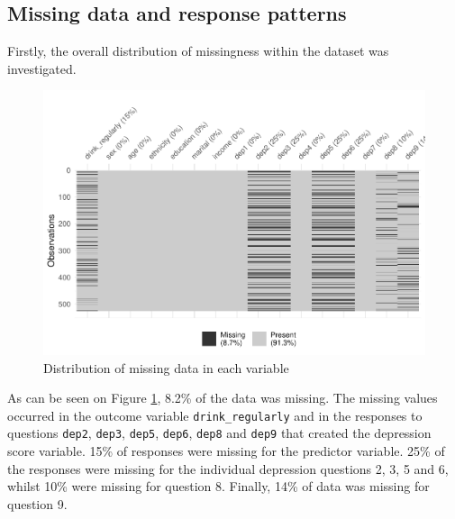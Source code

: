 \documentclass[
]{article}
\begin{document}
\hypertarget{missing-data-and-response-patterns}{%
\subsection{Missing data and response patterns}\label{missing-data-and-response-patterns}}

Firstly, the overall distribution of missingness within the dataset was investigated.

\begin{figure}
\centering
\includegraphics{report_files/figure-latex/mis-percentage-1.pdf}
\caption{\label{fig:mis-percentage}Distribution of missing data in each variable}
\end{figure}

As can be seen on Figure \ref{fig:mis-percentage}, 8.2\% of the data was missing. The missing values occurred in the outcome variable \texttt{drink\_regularly} and in the responses to questions \texttt{dep2}, \texttt{dep3}, \texttt{dep5}, \texttt{dep6}, \texttt{dep8} and \texttt{dep9} that created the depression score variable. 15\% of responses were missing for the predictor variable. 25\% of the responses were missing for the individual depression questions 2, 3, 5 and 6, whilst 10\% were missing for question 8. Finally, 14\% of data was missing for question 9.
\end{document}
